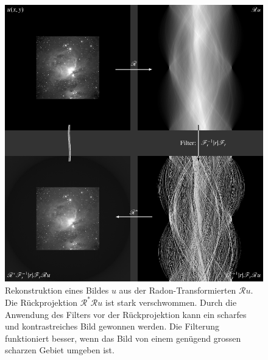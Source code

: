%
%
%
\begin{figure}
\centering
\includegraphics[width=\textwidth]{chapters/050-radon/images/orion2.pdf}
\caption{Rekonstruktion eines Bildes $u$ aus der Radon-Transformierten
$\mathscr{R}u$.
Die Rückprojektion $\mathscr{R}^*\mathscr{R}u$ ist stark verschwommen.
Durch die Anwendung des Filters vor der Rückprojektion kann ein
scharfes und kontrastreiches Bild gewonnen werden.
Die Filterung funktioniert besser, wenn das Bild von einem genügend 
grossen scharzen Gebiet umgeben ist.
\label{buch:radon:rueckprojektion:fig:rueckprojektion}}
\end{figure}
